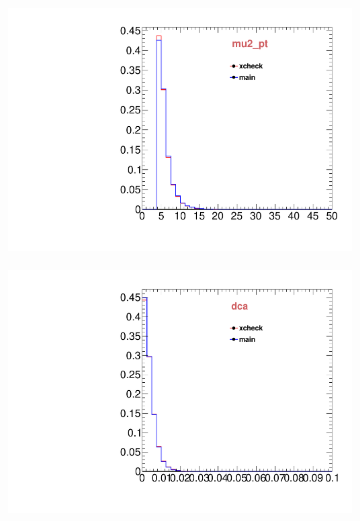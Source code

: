 \begin{figure}
\begin{subfigure}[b]{0.2\textwidth}
                \includegraphics[width=\textwidth]{Figures/VariablesComparison/MC_endcaps_figs/m2pt}
                \label{fig:MC_endcaps_m2pt}
        \end{subfigure}
        \begin{subfigure}[b]{0.2\textwidth}
                \centering
                \includegraphics[width=\textwidth]{Figures/VariablesComparison/MC_endcaps_figs/maxdoca}
                \label{fig:MC_endcaps_maxdoca}
        \end{subfigure}
        \begin{subfigure}[b]{0.2\textwidth}
                \centering

\end{subfigure}
\end{figure}
